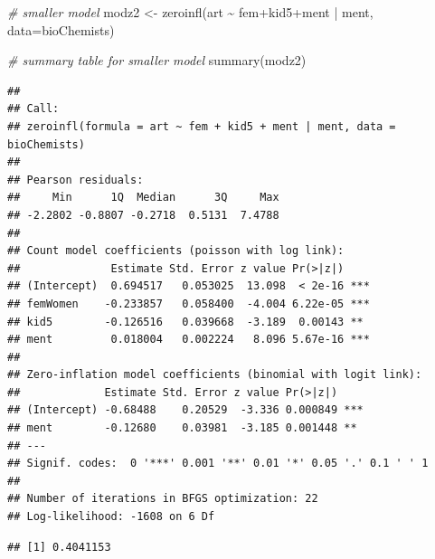 \documentclass[
  ignorenonframetext,
]{beamer}
\newenvironment{Shaded}{\begin{snugshade}}{\end{snugshade}}
\newcommand{\AttributeTok}[1]{\textcolor[rgb]{0.77,0.63,0.00}{#1}}
\newcommand{\CommentTok}[1]{\textcolor[rgb]{0.56,0.35,0.01}{\textit{#1}}}
\newcommand{\ConstantTok}[1]{\textcolor[rgb]{0.00,0.00,0.00}{#1}}
\newcommand{\DecValTok}[1]{\textcolor[rgb]{0.00,0.00,0.81}{#1}}
\newcommand{\FunctionTok}[1]{\textcolor[rgb]{0.00,0.00,0.00}{#1}}
\newcommand{\NormalTok}[1]{#1}
\newcommand{\OtherTok}[1]{\textcolor[rgb]{0.56,0.35,0.01}{#1}}
\newcommand{\SpecialCharTok}[1]{\textcolor[rgb]{0.00,0.00,0.00}{#1}}
\begin{document}
\begin{frame}[fragile]{}
\protect\hypertarget{section-44}{}
\tiny

\begin{Shaded}
\begin{Highlighting}[]
\CommentTok{\# smaller model}
\NormalTok{modz2 }\OtherTok{\textless{}{-}} \FunctionTok{zeroinfl}\NormalTok{(art }\SpecialCharTok{\textasciitilde{}}\NormalTok{ fem}\SpecialCharTok{+}\NormalTok{kid5}\SpecialCharTok{+}\NormalTok{ment }\SpecialCharTok{|}\NormalTok{ ment, }\AttributeTok{data=}\NormalTok{bioChemists)}

\CommentTok{\# summary table for smaller model}
\FunctionTok{summary}\NormalTok{(modz2)}
\end{Highlighting}
\end{Shaded}

\begin{verbatim}
## 
## Call:
## zeroinfl(formula = art ~ fem + kid5 + ment | ment, data = bioChemists)
## 
## Pearson residuals:
##     Min      1Q  Median      3Q     Max 
## -2.2802 -0.8807 -0.2718  0.5131  7.4788 
## 
## Count model coefficients (poisson with log link):
##              Estimate Std. Error z value Pr(>|z|)    
## (Intercept)  0.694517   0.053025  13.098  < 2e-16 ***
## femWomen    -0.233857   0.058400  -4.004 6.22e-05 ***
## kid5        -0.126516   0.039668  -3.189  0.00143 ** 
## ment         0.018004   0.002224   8.096 5.67e-16 ***
## 
## Zero-inflation model coefficients (binomial with logit link):
##             Estimate Std. Error z value Pr(>|z|)    
## (Intercept) -0.68488    0.20529  -3.336 0.000849 ***
## ment        -0.12680    0.03981  -3.185 0.001448 ** 
## ---
## Signif. codes:  0 '***' 0.001 '**' 0.01 '*' 0.05 '.' 0.1 ' ' 1 
## 
## Number of iterations in BFGS optimization: 22 
## Log-likelihood: -1608 on 6 Df
\end{verbatim}

\begin{Shaded}
\end{Shaded}

\begin{verbatim}
## [1] 0.4041153
\end{verbatim}
\end{frame}
\end{document}
